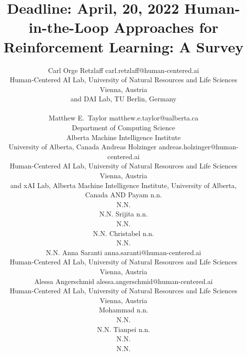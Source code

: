 \documentclass[twoside,11pt]{article}
\begin{document}
\title{Deadline: April, 20, 2022 Human-in-the-Loop Approaches for Reinforcement Learning: A Survey}

\author{\name Carl Orge Retzlaff \email carl.retzlaff@human-centered.ai\\ 
\addr Human-Centered AI Lab, University of Natural Resources and Life Sciences Vienna, Austria\\
and DAI Lab, TU Berlin, Germany\\ \\
\AND
\name Matthew E.~Taylor \email matthew.e.taylor@ualberta.ca \\
\addr Department of Computing Science\\
Alberta Machine Intelligence Institute\\
University of Alberta, Canada
\AND
\name Andreas Holzinger \email andreas.holzinger@human-centered.ai \\
\addr Human-Centered AI Lab, University of Natural Resources and Life Sciences Vienna, Austria \\
and xAI Lab, Alberta Machine Intelligence Institute, University of Alberta, Canada
AND
\name Payam \email n.n. \\
\addr N.N. \\ N.N.
\AND
\name Srijita \email n.n. \\
\addr N.N. \\ N.N.
\AND
\name Christabel \email n.n. \\
\addr N.N. \\ N.N.
\AND
\name Anna Saranti \email anna.saranti@human-centered.ai \\
\addr Human-Centered AI Lab, University of Natural Resources and Life Sciences Vienna, Austria\\
\AND
\name Alessa Angerschmid \email alessa.angerschmid@human-centered.ai \\
\addr Human-Centered AI Lab, University of Natural Resources and Life Sciences Vienna, Austria\\
\AND
\name Mohammad \email n.n. \\
\addr N.N. \\ N.N.
\AND
\name Tianpei \email n.n. \\
\addr N.N. \\ N.N.
}



\maketitle
\end{document}
